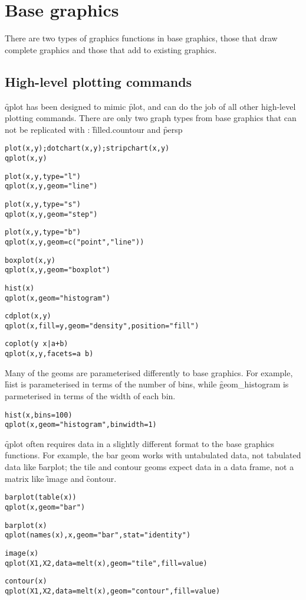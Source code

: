 \section{Base graphics}
\label{sec:translate-base}

There are two types of graphics functions in base graphics, those that draw complete graphics and those that add to existing graphics.  

\subsection{High-level plotting commands}

\f{qplot} has been designed to mimic \f{plot}, and can do the job of all other high-level plotting commands.  There are only two graph types from base graphics that can not be replicated with \ggplot: \f{filled.countour} and \f{persp}

\begin{alltt}
plot(x, y);  dotchart(x, y); stripchart(x, y)
qplot(x, y)

plot(x, y, type = "l")
qplot(x, y, geom = "line")

plot(x, y, type = "s")
qplot(x, y, geom = "step")

plot(x, y, type = "b")
qplot(x, y, geom = c("point", "line"))

boxplot(x, y)
qplot(x, y, geom = "boxplot")

hist(x)
qplot(x, geom = "histogram")

cdplot(x, y)
qplot(x, fill = y, geom = "density", position = "fill")

coplot(y ~ x | a + b)
qplot(x, y, facets = a ~ b)
\end{alltt}

Many of the geoms are parameterised differently to base graphics.  For example, \f{hist} is parameterised in terms of the number of bins, while \f{geom_histogram} is parmeterised in terms of the width of each bin.  

\begin{alltt}
hist(x, bins = 100)
qplot(x, geom = "histogram", binwidth = 1)
\end{alltt}

\f{qplot} often requires data in a slightly different format to the base graphics functions.  For example, the bar geom works with untabulated data, not tabulated data like \f{barplot}; the tile and contour geoms expect data in a data frame, not a matrix like \f{image} and \f{contour}.

\begin{alltt}
barplot(table(x))
qplot(x, geom = "bar")

barplot(x)
qplot(names(x), x, geom = "bar", stat = "identity")

image(x)
qplot(X1, X2, data = melt(x), geom = "tile", fill = value)

contour(x)
qplot(X1, X2, data = melt(x), geom = "contour", fill = value)
\end{alltt}

